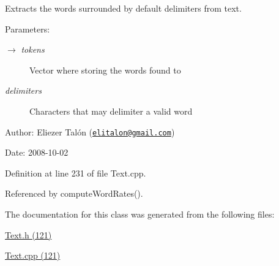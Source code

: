 Extracts the words surrounded by default delimiters from text. 

\begin{Desc}
\item[Parameters:]
\begin{description}
\item[\mbox{$\rightarrow$} {\em tokens}]Vector where storing the words found to \item[{\em delimiters}]Characters that may delimiter a valid word\end{description}
\end{Desc}
\begin{Desc}
\item[Author:]Eliezer Talón (\href{mailto:elitalon@gmail.com}{\tt elitalon@gmail.com}) \end{Desc}
\begin{Desc}
\item[Date:]2008-10-02 \end{Desc}


Definition at line 231 of file Text.cpp.

Referenced by computeWordRates().

The documentation for this class was generated from the following files:\begin{CompactItemize}
\item 
\hyperlink{_text_8h}{Text.h (121)}\item 
\hyperlink{_text_8cpp}{Text.cpp (121)}\end{CompactItemize}
